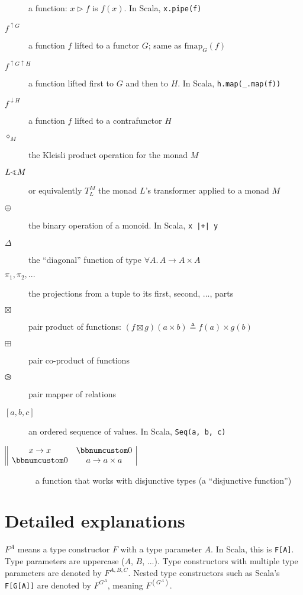 \begin{description}
a function: $x\triangleright f$ is $f(x)$. In Scala, \lstinline!x.pipe(f)!
\item [{$f^{\uparrow G}$}] \textemdash{} a function $f$ lifted to a functor
$G$; same as $\text{fmap}_{G}(f)$
\item [{$f^{\uparrow G\uparrow H}$}] \textemdash{} a function lifted first
to $G$ and then to $H$. In Scala, \lstinline!h.map(_.map(f))! 
\item [{$f^{\downarrow H}$}] \textemdash{} a function $f$ lifted to a
contrafunctor $H$ 
\item [{$\diamond_{M}$}] \textemdash{} the Kleisli product operation for
the monad $M$
\item [{$L\varangle M$}] or equivalently $T_{L}^{M}$ \textemdash{} the
monad $L$\textsf{'}s transformer applied to a monad $M$
\item [{$\oplus$}] \textemdash{} the binary operation of a monoid. In
Scala, \lstinline!x |+| y!
\item [{$\Delta$}] \textemdash{} the \textsf{``}diagonal\textsf{''} function of type $\forall A.\,A\rightarrow A\times A$
\item [{$\pi_{1},\pi_{2},...$}] \textemdash{} the projections from a tuple
to its first, second, ..., parts
\item [{$\boxtimes$}] \textemdash{} pair product of functions: $(f\boxtimes g)(a\times b)\triangleq f(a)\times g(b)$
\item [{$\boxplus$}] \textemdash{} pair co-product of functions
\item [{$\ogreaterthan$}] \textemdash{} pair mapper of relations
\item [{$\left[a,b,c\right]$}] \textemdash{} an ordered sequence of values.
In Scala, \lstinline!Seq(a, b, c)!
\item [{$\begin{array}{||cc|}
x\rightarrow x & \bbnum 0\\
\bbnum 0 & a\rightarrow a\times a
\end{array}$}] ~ \textemdash{} a function that works with disjunctive types
(a \textsf{``}disjunctive function\textsf{''})
\end{description}

\section{Detailed explanations}

$F^{A}$ means a type constructor $F$ with a type parameter $A$.
In Scala, this is \lstinline!F[A]!. Type parameters are uppercase
($A$, $B$, ...). Type constructors with multiple type parameters
are denoted by $F^{A,B,C}$. Nested type constructors such as Scala\textsf{'}s
\lstinline!F[G[A]]! are denoted by $F^{G^{A}}$, meaning $F^{(G^{A})}$.

